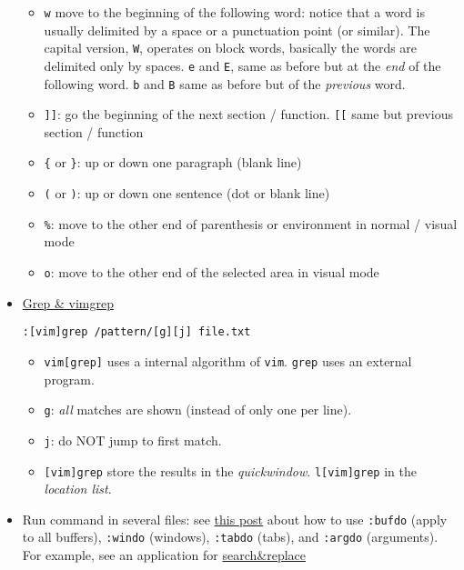 \documentclass[a4paper,12pt,%
              final%
              ]{article}
\begin{document}
\begin{itemize}
\begin{itemize}
      \item \texttt{w} move to the beginning of the following word: notice that a
        word is usually delimited by a space or a punctuation point (or similar). The
        capital version, \texttt{W}, operates on block words, basically the words are
        delimited only by spaces. \texttt{e} and \texttt{E}, same as before but at
        the \emph{end} of the following word. \texttt{b} and \texttt{B} same as
        before but of the \emph{previous} word.
      \item \texttt{]]}: go the beginning of the next section / function. \texttt{[[}
        same but previous section / function
      \item \verb|{| or \verb|}|: up or down one paragraph (blank line)
      \item \verb|(| or \verb|)|: up or down one sentence (dot or blank line)
      \item \verb|%|: move to the other end of parenthesis or environment in normal
        / visual mode
      \item \verb|o|: move to the other end of the selected area in visual mode
    \end{itemize}
  \item \href{https://vim.fandom.com/wiki/Find_in_files_within_Vim}{Grep \& vimgrep}
\begin{verbatim}
:[vim]grep /pattern/[g][j] file.txt
\end{verbatim}
    \begin{itemize}
      \item \texttt{vim[grep]} uses a internal algorithm of \texttt{vim}.
        \texttt{grep} uses an external program.
      \item \texttt{g}: \emph{all} matches are shown (instead of only one per line).
      \item \texttt{j}: do NOT jump to first match.
      \item \texttt{[vim]grep} store the results in the \emph{quickwindow}.
        \texttt{l[vim]grep} in the \emph{location list}.
    \end{itemize}
  \item Run command in several files: see
    \href{https://vim.fandom.com/wiki/Run_a_command_in_multiple_buffers}{this post}
    about how to use \verb|:bufdo| (apply to all buffers), \verb|:windo| (windows),
    \verb|:tabdo| (tabs), and \verb|:argdo| (arguments). For example, see an
    application for
    \href{https://vim.fandom.com/wiki/Search_and_replace_in_multiple_buffers}{search\&replace}

\end{itemize}
\end{document}
